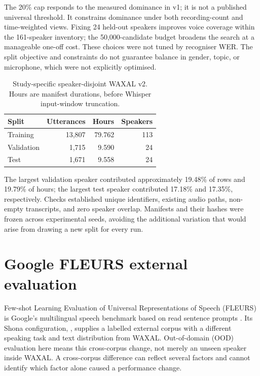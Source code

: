 \documentclass[12pt,a4paper]{report}
\newcommand{\code}[1]{\texttt{\detokenize{#1}}}
\begin{document}
The 20\% cap responds to the measured dominance in v1; it is not a published universal threshold. It constrains dominance under both recording-count and time-weighted views. Fixing 24 held-out speakers improves voice coverage within the 161-speaker inventory; the 50,000-candidate budget broadens the search at a manageable one-off cost. These choices were not tuned by recogniser WER. The split objective and constraints do not guarantee balance in gender, topic, or microphone, which were not explicitly optimised.

\begin{table}[htbp]\centering
\caption{Study-specific speaker-disjoint WAXAL v2. Hours are manifest durations, before Whisper input-window truncation.}\label{tab:v2}
\begin{tabular}{lrrr}\toprule Split & Utterances & Hours & Speakers\\\midrule
Training & 13,807 & 79.762 & 113\\
Validation & 1,715 & 9.590 & 24\\
Test & 1,671 & 9.558 & 24\\\bottomrule
\end{tabular}\end{table}

The largest validation speaker contributed approximately 19.48\% of rows and 19.79\% of hours; the largest test speaker contributed 17.18\% and 17.35\%, respectively. Checks established unique identifiers, existing audio paths, non-empty transcripts, and zero speaker overlap. Manifests and their hashes were frozen across experimental seeds, avoiding the additional variation that would arise from drawing a new split for every run.

\section{Google FLEURS external evaluation}

Few-shot Learning Evaluation of Universal Representations of Speech (FLEURS) is Google's multilingual speech benchmark based on read sentence prompts \citep{Conneau2022}. Its Shona configuration, \code{sn_zw}, supplies a labelled external corpus with a different speaking task and text distribution from WAXAL. Out-of-domain (OOD) evaluation here means this cross-corpus change, not merely an unseen speaker inside WAXAL. A cross-corpus difference can reflect several factors and cannot identify which factor alone caused a performance change.
\end{document}
